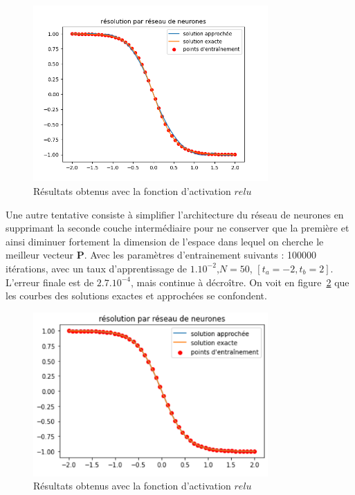 \documentclass[12pt]{report}
\begin{document}
\begin{figure}
    \centering
    \includegraphics[width=0.8\textwidth]{direct_relu_0.001_10000_32_16_v2.png}
    \caption{Résultats obtenus avec la fonction d'activation $relu$}
    \label{fig:relu apprentissage direct}
\end{figure}

Une autre tentative consiste à simplifier l'architecture du réseau de neurones en supprimant la seconde couche intermédiaire pour ne conserver que la première et ainsi diminuer fortement la dimension de l'espace dans lequel on cherche le meilleur vecteur $\bm P$. Avec les paramètres d'entrainement suivants : 100000 itérations, avec un taux d'apprentissage de $1.10^{-2}$,$N=50$, $[t_a = -2, t_b = 2]$.
L'erreur finale est de $2.7.10^{-4}$, mais continue à décroître.
On voit en figure~\ref{fig:Mz sigmoid 1 couche} que les courbes des solutions exactes et approchées se confondent.

\begin{figure}
    \centering
    \includegraphics[width=0.8\textwidth]{Mz_50000_epochs_1_couche.PNG}
    \caption{Résultats obtenus avec la fonction d'activation $relu$}
    \label{fig:Mz sigmoid 1 couche}
\end{figure}
\end{document}
